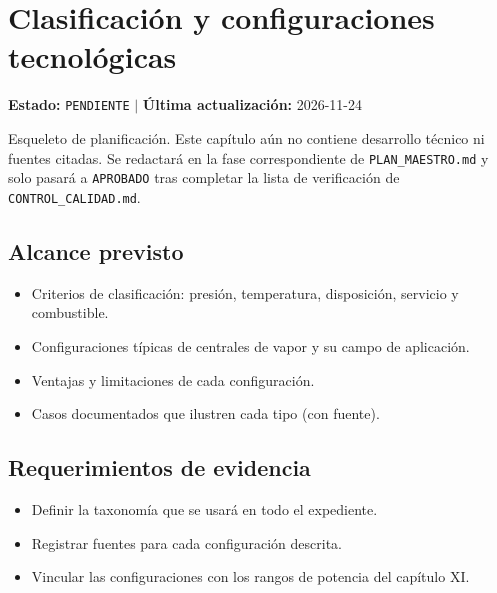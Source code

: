 \chapter{Clasificación y configuraciones tecnológicas}
\label{cap:03}

\begin{cajaestado}
\textbf{Estado:} \texttt{PENDIENTE} \quad$|$\quad
\textbf{Última actualización:} 2026-11-24

Esqueleto de planificación. Este capítulo aún no contiene desarrollo técnico ni
fuentes citadas. Se redactará en la fase correspondiente de
\texttt{PLAN\_MAESTRO.md} y solo pasará a \texttt{APROBADO} tras completar
la lista de verificación de \texttt{CONTROL\_CALIDAD.md}.
\end{cajaestado}

\section{Alcance previsto}
\begin{itemize}
  \item Criterios de clasificación: presión, temperatura, disposición, servicio y combustible.
  \item Configuraciones típicas de centrales de vapor y su campo de aplicación.
  \item Ventajas y limitaciones de cada configuración.
  \item Casos documentados que ilustren cada tipo (con fuente).
\end{itemize}

\section{Requerimientos de evidencia}
\begin{itemize}
  \item Definir la taxonomía que se usará en todo el expediente.
  \item Registrar fuentes para cada configuración descrita.
  \item Vincular las configuraciones con los rangos de potencia del capítulo XI.
\end{itemize}
